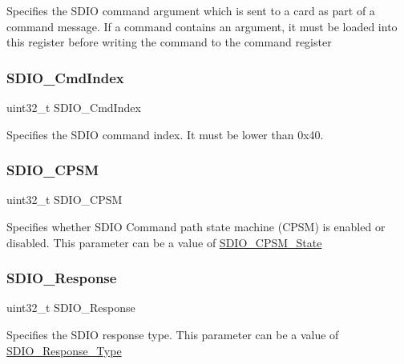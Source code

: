 Specifies the S\+D\+IO command argument which is sent to a card as part of a command message. If a command contains an argument, it must be loaded into this register before writing the command to the command register \mbox{\label{struct_s_d_i_o___cmd_init_type_def_a8b55bd6b004ba9105f153e0147fbaa25}} 
\subsubsection{\texorpdfstring{SDIO\_CmdIndex}{SDIO\_CmdIndex}}
{\footnotesize\ttfamily uint32\+\_\+t S\+D\+I\+O\+\_\+\+Cmd\+Index}

Specifies the S\+D\+IO command index. It must be lower than 0x40. \mbox{\label{struct_s_d_i_o___cmd_init_type_def_a67da149308b7fcafddd7b3d62513845f}} 
\subsubsection{\texorpdfstring{SDIO\_CPSM}{SDIO\_CPSM}}
{\footnotesize\ttfamily uint32\+\_\+t S\+D\+I\+O\+\_\+\+C\+P\+SM}

Specifies whether S\+D\+IO Command path state machine (C\+P\+SM) is enabled or disabled. This parameter can be a value of \mbox{\hyperlink{group___s_d_i_o___c_p_s_m___state}{S\+D\+I\+O\+\_\+\+C\+P\+S\+M\+\_\+\+State}} \mbox{\label{struct_s_d_i_o___cmd_init_type_def_aeff6d745f123c5f75fd094a856426aae}} 
\subsubsection{\texorpdfstring{SDIO\_Response}{SDIO\_Response}}
{\footnotesize\ttfamily uint32\+\_\+t S\+D\+I\+O\+\_\+\+Response}

Specifies the S\+D\+IO response type. This parameter can be a value of \mbox{\hyperlink{group___s_d_i_o___response___type}{S\+D\+I\+O\+\_\+\+Response\+\_\+\+Type}} \mbox{\label{struct_s_d_i_o___cmd_init_type_def_afd47828b3053d2c3bf582fe8d092ab27}} 

